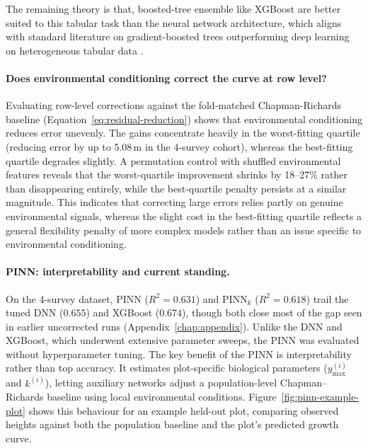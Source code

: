 \documentclass[logo,msc,ai]{infthesis}           %
\begin{document}
The remaining theory is that, boosted-tree ensemble like XGBoost are better suited to this tabular task than the neural network architecture, which aligns with standard literature on gradient-boosted trees outperforming deep learning on heterogeneous tabular data \cite{shwartzziv2021Tabular_C4_NN}.


\paragraph*{Does environmental conditioning correct the curve at row level?}
Evaluating row-level corrections against the fold-matched Chapman-Richards baseline (Equation~\ref{eq:residual-reduction}) shows that environmental conditioning reduces error unevenly. The gains concentrate heavily in the worst-fitting quartile (reducing error by up to 5.08\,m in the 4-survey cohort), whereas the best-fitting quartile degrades slightly. A permutation control with shuffled environmental features reveals that the worst-quartile improvement shrinks by 18--27\% rather than disappearing entirely, while the best-quartile penalty persists at a similar magnitude. This indicates that correcting large errors relies partly on genuine environmental signals, whereas the slight cost in the best-fitting quartile reflects a general flexibility penalty of more complex models rather than an issue specific to environmental conditioning.

\paragraph*{PINN: interpretability and current standing.}
\label{sec:rq1-pinn-limitation}
On the 4-survey dataset, PINN ($R^2 = 0.631$) and $\text{PINN}_k$ ($R^2 = 0.618$) trail the tuned DNN ($0.655$) and XGBoost ($0.674$), though both close most of the gap seen in earlier uncorrected runs (Appendix~\ref{chap:appendix}). Unlike the DNN and XGBoost, which underwent extensive parameter sweeps, the PINN was evaluated without hyperparameter tuning. The key benefit of the PINN is interpretability rather than top accuracy. It estimates plot-specific biological parameters ($y_{\max}^{(i)}$ and $k^{(i)}$), letting auxiliary networks adjust a population-level Chapman--Richards baseline using local environmental conditions. Figure~\ref{fig:pinn-example-plot} shows this behaviour for an example held-out plot, comparing observed heights against both the population baseline and the plot's predicted growth curve.
\end{document}
